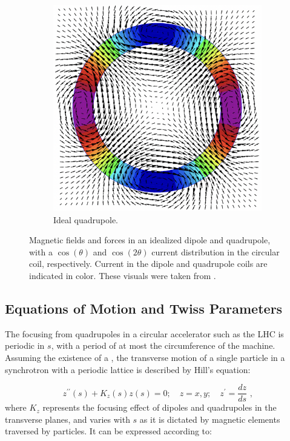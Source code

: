 \begin{figure}[!hbt]
\begin{subfigure}[b]{0.45\textwidth}
        \includegraphics[width=\textwidth]{Figures/Beam_Dynamics_Theory/ideal_quadrupole_cos_2theta.png}
        \caption{Ideal quadrupole.}
        \label{fig:ideal_quadrupole}
    \end{subfigure}
    \caption{Magnetic fields and forces in an idealized dipole and quadrupole, with a \(\cos(\theta)\) and \(\cos(2\theta)\) current distribution in the circular coil, respectively. Current in the dipole and quadrupole coils are indicated in color. These visuals were taken from \cite{CERN:Russenschuck:CAS_Design_Magnets}.}
    \label{figure:dipole_quadrupole_fields}
\end{figure}

\subsection{Equations of Motion and Twiss Parameters}
\label{subsection:equations_of_motion_and_twiss_parameters}

The focusing from quadrupoles in a circular accelerator such as the LHC is periodic in \(s\), with a period of at most the circumference of the machine.
Assuming the existence of a , the transverse motion of a single particle in a synchrotron with a periodic lattice is described by Hill's equation:

\begin{equation}
    z^{\prime \prime}(s) + K_z(s) z(s) = 0; \quad z = x, y; \quad z^{\prime} = \dfrac{dz}{ds} \text{ ,}
    \label{equation:hill_equation}
\end{equation}
where \(K_z\) represents the focusing effect of dipoles and quadrupoles in the transverse planes, and varies with \(s\) as it is dictated by magnetic elements traversed by particles.
It can be expressed according to:

